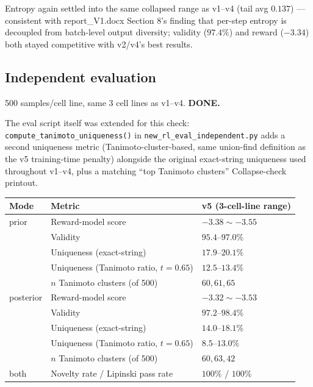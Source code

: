 \documentclass[11pt]{article}
\newcommand{\code}[1]{\texttt{#1}}
\begin{document}
Entropy again settled into the same collapsed range as v1--v4 (tail avg $0.137$) --- consistent with report\_V1.docx Section 8's finding that per-step entropy is decoupled from batch-level output diversity; validity ($97.4\%$) and reward ($-3.34$) both stayed competitive with v2/v4's best results.

\subsection{Independent evaluation}
\label{sec:eval}
500 samples/cell line, same 3 cell lines as v1--v4. \textbf{DONE.}

The eval script itself was extended for this check: \code{compute\_tanimoto\_uniqueness()} in \newline\code{new\_rl\_eval\_independent.py} adds a second uniqueness metric (Tanimoto-cluster-based, same union-find definition as the v5 training-time penalty) alongside the original exact-string uniqueness used throughout v1--v4, plus a matching ``top Tanimoto clusters'' Collapse-check printout.

\begin{center}
\begin{tabular}{@{}l l l@{}}
\toprule
\textbf{Mode} & \textbf{Metric} & \textbf{v5 (3-cell-line range)} \\
\midrule
prior & Reward-model score & $-3.38 \sim -3.55$ \\
      & Validity & $95.4$--$97.0\%$ \\
      & Uniqueness (exact-string) & $17.9$--$20.1\%$ \\
      & Uniqueness (Tanimoto ratio, $t=0.65$) & $12.5$--$13.4\%$ \\
      & $n$ Tanimoto clusters (of 500) & $60, 61, 65$ \\
posterior & Reward-model score & $-3.32 \sim -3.53$ \\
      & Validity & $97.2$--$98.4\%$ \\
      & Uniqueness (exact-string) & $14.0$--$18.1\%$ \\
      & Uniqueness (Tanimoto ratio, $t=0.65$) & $8.5$--$13.0\%$ \\
      & $n$ Tanimoto clusters (of 500) & $60, 63, 42$ \\
both  & Novelty rate / Lipinski pass rate & $100\%$ / $100\%$ \\
\bottomrule
\end{tabular}
\end{center}
\end{document}
